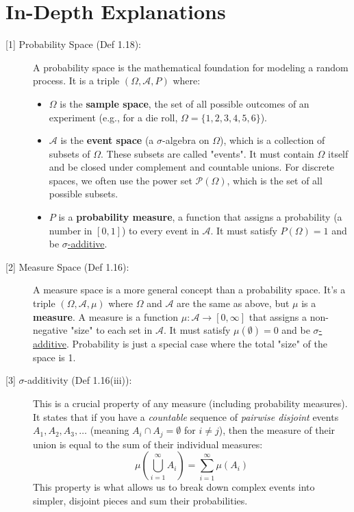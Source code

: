 \documentclass[11pt,a4paper]{article}
\begin{document}
\newpage
\section*{In-Depth Explanations}
\begin{description}
    \item[\hypertarget{note1}{[1] Probability Space (Def 1.18):}] A probability space is the mathematical foundation for modeling a random process. It is a triple $(\Omega, \mathcal{A}, P)$ where:
    \begin{itemize}
        \item $\Omega$ is the \textbf{sample space}, the set of all possible outcomes of an experiment (e.g., for a die roll, $\Omega = \{1, 2, 3, 4, 5, 6\}$).
        \item $\mathcal{A}$ is the \textbf{event space} (a $\sigma$-algebra on $\Omega$), which is a collection of subsets of $\Omega$. These subsets are called "events". It must contain $\Omega$ itself and be closed under complement and countable unions. For discrete spaces, we often use the power set $\mathcal{P}(\Omega)$, which is the set of all possible subsets.
        \item $P$ is a \textbf{probability measure}, a function that assigns a probability (a number in $[0,1]$) to every event in $\mathcal{A}$. It must satisfy $P(\Omega) = 1$ and be \hyperlink{note3}{$\sigma$-additive}.
    \end{itemize}

    \item[\hypertarget{note2}{[2] Measure Space (Def 1.16):}] A measure space is a more general concept than a probability space. It's a triple $(\Omega, \mathcal{A}, \mu)$ where $\Omega$ and $\mathcal{A}$ are the same as above, but $\mu$ is a \textbf{measure}. A measure is a function $\mu: \mathcal{A} \to [0, \infty]$ that assigns a non-negative "size" to each set in $\mathcal{A}$. It must satisfy $\mu(\emptyset)=0$ and be \hyperlink{note3}{$\sigma$-additive}. Probability is just a special case where the total "size" of the space is 1.

    \item[\hypertarget{note3}{[3] $\sigma$-additivity (Def 1.16(iii)):}] This is a crucial property of any measure (including probability measures). It states that if you have a \emph{countable} sequence of \emph{pairwise disjoint} events $A_1, A_2, A_3, \dots$ (meaning $A_i \cap A_j = \emptyset$ for $i \neq j$), then the measure of their union is equal to the sum of their individual measures:
    \[ \mu\left(\bigcup_{i=1}^\infty A_i\right) = \sum_{i=1}^\infty \mu(A_i) \]
    This property is what allows us to break down complex events into simpler, disjoint pieces and sum their probabilities.


\end{description}
\end{document}

